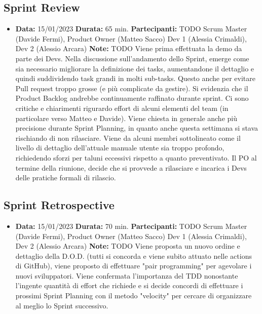 \documentclass{article}
\begin{document}
    \subsection{Sprint Review}
    \begin{itemize}
        \item \textbf{Data:} 15/01/2023
        \newline \textbf{Durata:} 65 min.
        \newline \textbf{Partecipanti:} TODO Scrum Master (Davide Fermi), Product Owner (Matteo Sacco) Dev 1 (Alessia Crimaldi), Dev 2 (Alessio Arcara)
        \newline \textbf{Note:} TODO Viene prima effettuata la demo da parte dei Devs. Nella discussione sull'andamento dello Sprint, emerge come sia necessario migliorare la definizione dei tasks, aumentandone il dettaglio e quindi suddividendo task grandi in molti sub-tasks. Questo anche per evitare Pull request troppo grosse (e più complicate da gestire). Si evidenzia che il Product Backlog andrebbe continuamente raffinato durante sprint. Ci sono critiche e chiarimenti rigurardo effort di alcuni elementi del team (in particolare verso Matteo e Davide). Viene chiesta in generale anche più precisione durante Sprint Planning, in quanto anche questa settimana si stava rischiando di non rilasciare. Viene da alcuni membri sottolineato come il livello di dettaglio dell'attuale manuale utente sia troppo profondo, richiedendo sforzi per taluni eccessivi rispetto a quanto preventivato. Il PO al termine della riunione, decide che si provvede a rilasciare e incarica i Devs delle pratiche formali di rilascio.
    \end{itemize}

    \subsection{Sprint Retrospective}
    \begin{itemize}
        \item \textbf{Data:} 15/01/2023
        \newline \textbf{Durata:} 70 min.
        \newline \textbf{Partecipanti:}  TODO Scrum Master (Davide Fermi), Product Owner (Matteo Sacco) Dev 1 (Alessia Crimaldi), Dev 2 (Alessio Arcara)
        \newline \textbf{Note:} TODO Viene proposta un nuovo ordine e dettaglio della D.O.D. (tutti si concorda e viene subito attuato nelle actions di GitHub), viene proposto di effettuare "pair programming" per agevolare i nuovi sviluppatori. Viene confermata l'importanza del TDD nonostante l'ingente quantità di effort che richiede e si decide concordi di effettuare i prossimi Sprint Planning con il metodo "velocity" per cercare di organizzare al meglio lo Sprint successivo.
    \end{itemize}
\end{document}
